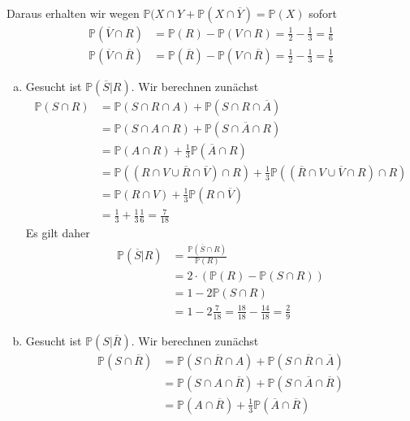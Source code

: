 \documentclass[uebung]{lecture}
\renewcommand{\P}{\mathbb{P}}
\begin{document}
\begin{aufgabe}
\begin{align*}
    \end{align*}
    Daraus erhalten wir wegen $\P(X \cap Y + \P(X \cap \overline{Y}) = \P(X)$ sofort
    \begin{align*}
        \P(\overline V\cap R) &= \P(R) - \P(V\cap R) = \frac{1}{2} - \frac{1}{3} = \frac{1}{6}\\ 
        \P(\overline{V} \cap \overline{R}) &= \P(\overline{R}) - \P(V \cap \overline{R}) = \frac{1}{2} - \frac{1}{3} = \frac{1}{6}
    \end{align*} 
    \begin{enumerate}[(a)]
        \item Gesucht ist $\P(\overline{S}|R)$. 
        Wir berechnen zunächst
        \begin{align*}
            \P(S \cap R) &= \P(S \cap R \cap A) + \P(S \cap R\cap \overline{A})\\
            &= \P(S\cap A \cap R) + \P(S \cap \overline{A} \cap R)\\
            &= \P(A \cap R) + \frac{1}{3} \P(\overline{A} \cap R)\\
            &= \P((R \cap V \cup \overline R \cap \overline V) \cap R) + \frac{1}{3}\P((\overline{R} \cap V \cup \overline{V} \cap R) \cap R)\\
            &= \P(R\cap V) + \frac{1}{3} \P(R \cap \overline{V})\\
            &= \frac{1}{3} + \frac{1}{3} \frac{1}{6} = \frac{7}{18}
        \end{align*}
        Es gilt daher
        \begin{align*}
            \P(\overline{S}|R) &= \frac{\P(\overline{S}\cap R)}{\P(R)}\\
            &= 2 \cdot (\P(R) - \P(S \cap R))\\
            &= 1 - 2 \P(S \cap R)\\
            &= 1 - 2 \frac{7}{18} = \frac{18}{18} - \frac{14}{18} = \frac{2}{9}
        \end{align*}
        \item Gesucht ist $\P(S| \overline{R})$.
        Wir berechnen zunächst
        \begin{align*}
            \P(S \cap \overline R) &= \P(S \cap \overline R \cap A) + \P(S \cap \overline R\cap \overline{A})\\
            &= \P(S\cap A \cap \overline R) + \P(S \cap \overline{A} \cap \overline R)\\
            &= \P(A \cap \overline R) + \frac{1}{3} \P(\overline{A} \cap \overline R)\\

\end{align*}
\end{enumerate}
\end{aufgabe}
\end{document}
